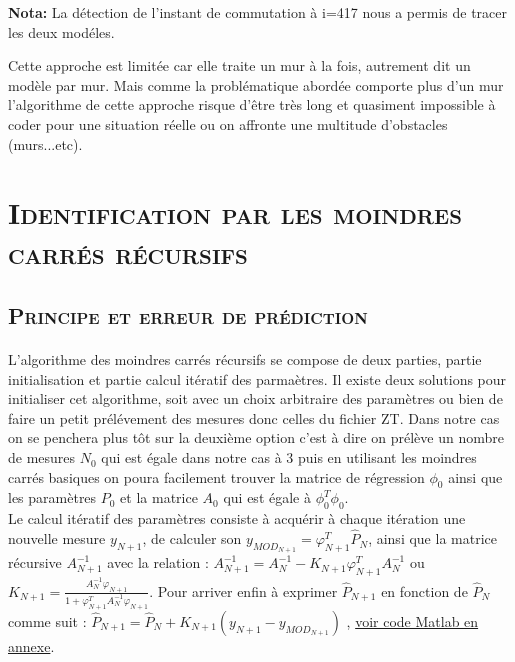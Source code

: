 	\textbf{Nota:} La détection de l'instant de commutation à i=417 nous a permis de tracer les deux modéles. \\[1cm] 
	
	\par Cette approche est limitée car elle traite un mur à la fois, autrement dit un modèle par mur. Mais comme la problématique abordée comporte plus d'un mur l'algorithme de cette approche risque d'être très long et quasiment impossible à coder pour une situation réelle ou on affronte une multitude d'obstacles (murs...etc). 
	

\section{\textsc{Identification par les moindres carrés récursifs}}
\subsection{\textsc{ Principe et erreur de prédiction }}

	\paragraph{} L'algorithme des moindres carrés récursifs se compose de deux parties, partie initialisation et partie calcul itératif des parmaètres. Il existe deux solutions pour initialiser cet algorithme, soit avec un choix arbitraire des paramètres ou bien de faire un petit prélévement des mesures donc celles du fichier ZT. Dans notre cas on se penchera plus tôt sur la deuxième option c'est à dire on prélève un nombre de mesures $N_0$ qui est égale dans notre cas à $3$ puis en utilisant les moindres carrés basiques on poura facilement trouver la matrice de régression $\phi_0$ ainsi que les paramètres $P_0$ et la matrice $A_0$ qui est égale à $\phi^{T}_{0} \phi_0$.\\
Le calcul itératif des paramètres consiste à acquérir à chaque itération une nouvelle mesure $y_{N+1}$, de calculer son $y_{MOD_{N+1}} = \varphi^{T}_{N+1} \hat{P}_N$, ainsi que la matrice récursive  $A^{-1}_{N+1}$ avec la relation : $A^{-1}_{N+1} = A^{-1}_{N} - K_{N+1}\varphi^{T}_{N+1} A^{-1}_{N} $ ou $K_{N+1} = \frac{ A^{-1}_{N}\varphi_{N+1} }{ 1+\varphi^{T}_{N+1} A^{-1}_{N} \varphi_{N+1}  }$. Pour arriver enfin à exprimer $\hat{P}_{N+1} $ en fonction de $\hat{P}_N$ comme suit :  $\hat{P}_{N+1} = \hat{P}_N + K_{N+1} (y_{N+1} - y_{MOD_{N+1}}) $
, \label{section 1.3.1} \hyperref[Annexe B] {voir code Matlab en annexe}. \\

